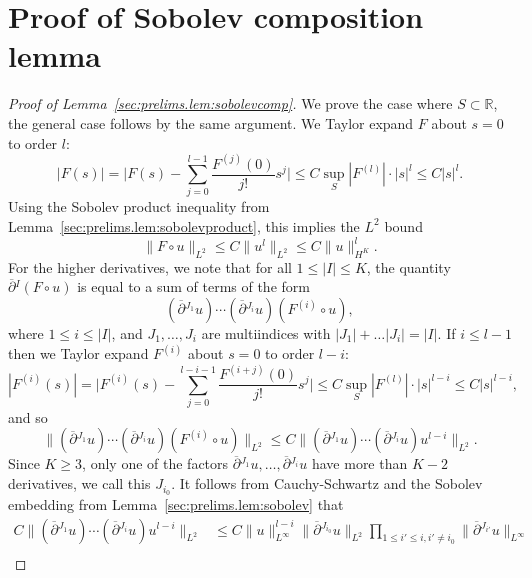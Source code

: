 \documentclass{article}
\newcommand{\RR}{\mathbb{R}}
\newcommand{\ol}{\overline}
\newcommand{\pa}{\partial}
\begin{document}
\section{Proof of Sobolev composition lemma}\label{app:sobolevcomp}
\begin{proof}[Proof of Lemma~\ref{sec:prelims.lem:sobolevcomp}]
    We prove the case where $S \subset \RR$, the general case follows by the same argument. We Taylor expand $F$ about $s = 0$ to order $l$:
    \begin{equation}
        |F(s)| = \Big|F(s) - \sum_{j=0}^{l-1}\frac{F^{(j)}(0)}{j!}s^j\Big| \leq C\sup_{S}|F^{(l)}|\cdot|s|^{l} \leq C|s|^{l}.
    \end{equation}
    Using the Sobolev product inequality from Lemma~\ref{sec:prelims.lem:sobolevproduct}, this implies the $L^2$ bound
    \begin{equation}
        \|F\circ u\|_{L^2} \leq C\|u^{l}\|_{L^2} \leq C\|u\|_{H^K}^{l}.
    \end{equation}
    For the higher derivatives, we note that for all $1 \leq |I| \leq K$, the quantity $\ol{\pa}{}^I(F \circ u)$ is equal to a sum of terms of the form
    \begin{equation}
        (\ol{\pa}{}^{J_1}u) \cdots (\ol{\pa}{}^{J_i}u) (F^{(i)}\circ u),
    \end{equation}
    where $1 \leq i \leq |I|$, and $J_1,\dots,J_i$ are multiindices with $|J_1| + \dots |J_i| = |I|$. If $i \leq l-1$ then we Taylor expand $F^{(i)}$ about $s = 0$ to order $l-i$:
    \begin{equation}
        |F^{(i)}(s)| = \Big|F^{(i)}(s) - \sum_{j=0}^{l-i-1}\frac{F^{(i+j)}(0)}{j!}s^j\Big| \leq C\sup_{S}|F^{(l)}|\cdot|s|^{l-i} \leq C|s|^{l-i},
    \end{equation}
    and so
    \begin{equation}
        \|(\ol{\pa}{}^{J_1}u) \cdots (\ol{\pa}{}^{J_i}u) (F^{(i)}\circ u)\|_{L^2} \leq C\|(\ol{\pa}{}^{J_1}u) \cdots (\ol{\pa}{}^{J_i}u) u^{l-i}\|_{L^2}.
    \end{equation}
    Since $K \geq 3$, only one of the factors $\ol{\pa}{}^{J_1}u,\dots,\ol{\pa}{}^{J_i}u$ have more than $K-2$ derivatives, we call this $J_{i_0}$. It follows from Cauchy-Schwartz and the Sobolev embedding from Lemma~\ref{sec:prelims.lem:sobolev} that
    \begin{align}
        C\|(\ol{\pa}{}^{J_1}u) \cdots (\ol{\pa}{}^{J_i}u) u^{l-i}\|_{L^2} &\leq C\|u\|_{L^\infty}^{l-i}\|\ol{\pa}{}^{J_{i_0}}u\|_{L^{2}}\prod_{1 \leq i' \leq i,i'\neq i_0}\|\ol{\pa}{}^{J_{i'}}u\|_{L^{\infty}}\nonumber\\

\end{align}
\end{proof}
\end{document}
